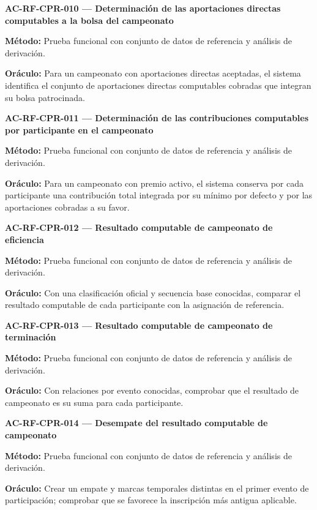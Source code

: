 \documentclass[10pt,letterpaper]{article}
\begin{document}
\noindent\textbf{AC-RF-CPR-010 --- Determinación de las aportaciones directas computables a la bolsa del campeonato}\par
\textbf{Método:} Prueba funcional con conjunto de datos de referencia y análisis de derivación.\par
\textbf{Oráculo:} Para un campeonato con aportaciones directas aceptadas, el sistema identifica el conjunto de aportaciones directas computables cobradas que integran su bolsa patrocinada.\par\vspace{0.45em}
\noindent\textbf{AC-RF-CPR-011 --- Determinación de las contribuciones computables por participante en el campeonato}\par
\textbf{Método:} Prueba funcional con conjunto de datos de referencia y análisis de derivación.\par
\textbf{Oráculo:} Para un campeonato con premio activo, el sistema conserva por cada participante una contribución total integrada por su mínimo por defecto y por las aportaciones cobradas a su favor.\par\vspace{0.45em}
\noindent\textbf{AC-RF-CPR-012 --- Resultado computable de campeonato de eficiencia}\par
\textbf{Método:} Prueba funcional con conjunto de datos de referencia y análisis de derivación.\par
\textbf{Oráculo:} Con una clasificación oficial y secuencia base conocidas, comparar el resultado computable de cada participante con la asignación de referencia.\par\vspace{0.45em}
\noindent\textbf{AC-RF-CPR-013 --- Resultado computable de campeonato de terminación}\par
\textbf{Método:} Prueba funcional con conjunto de datos de referencia y análisis de derivación.\par
\textbf{Oráculo:} Con relaciones por evento conocidas, comprobar que el resultado de campeonato es su suma para cada participante.\par\vspace{0.45em}
\noindent\textbf{AC-RF-CPR-014 --- Desempate del resultado computable de campeonato}\par
\textbf{Método:} Prueba funcional con conjunto de datos de referencia y análisis de derivación.\par
\textbf{Oráculo:} Crear un empate y marcas temporales distintas en el primer evento de participación; comprobar que se favorece la inscripción más antigua aplicable.\par\vspace{0.45em}
\end{document}

